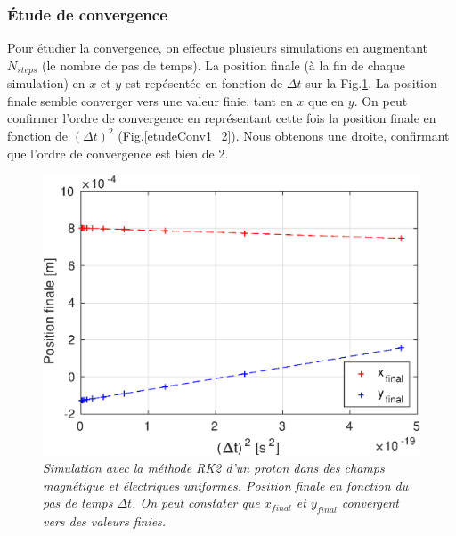 \documentclass[a4paper,12pt,oneside]{article}
\begin{document}
\subsubsection{Étude de convergence}
 Pour étudier la convergence, on effectue plusieurs simulations en augmentant $N_{steps}$ (le nombre de pas de temps). La position finale (à la fin de chaque simulation) en $x$ et $y$ est repésentée en fonction de $\Delta t$ sur la Fig.\ref{etudeConv1_1}. La position finale semble converger vers une valeur finie, tant en $x$ que en $y$.
 On peut confirmer l'ordre de convergence en représentant cette fois la position finale en fonction de $(\Delta t)^2$ (Fig.\ref{etudeConv1_2}). Nous obtenons une droite, confirmant que l'ordre de convergence est bien de 2.
\begin{figure}[H]
\centerline{\includegraphics[width=0.95\linewidth,angle=0]{application1/etudeConv1_1}}
\caption{ \label{etudeConv1_1}\em
 Simulation avec la méthode RK2 d'un proton dans des champs magnétique et électriques uniformes. Position finale en fonction du pas de temps $\Delta t$. On peut constater que $x_{final}$ et $y_{final}$ convergent vers des valeurs finies.
}
\end{figure}
\end{document}
